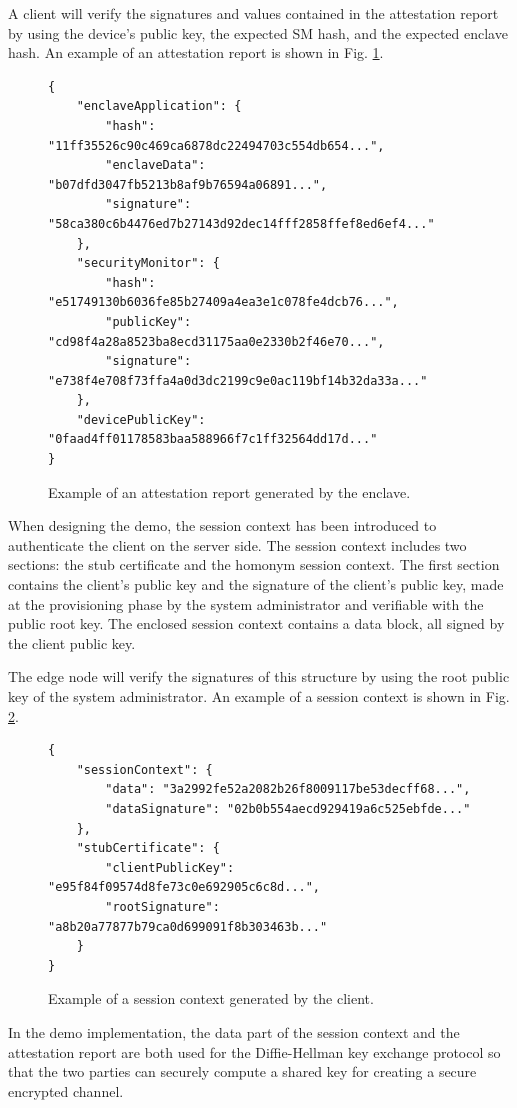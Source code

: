 A client will verify the signatures and values contained in the attestation report by using the device's public key, the expected SM hash, and the expected enclave hash. An example of an attestation report is shown in Fig. \ref{attestation-report}. \\
\begin{figure}[H]
\begin{lstlisting}[style=json, frame=single]
{
    "enclaveApplication": {
        "hash": "11ff35526c90c469ca6878dc22494703c554db654...",
        "enclaveData": "b07dfd3047fb5213b8af9b76594a06891...",
        "signature": "58ca380c6b4476ed7b27143d92dec14fff2858ffef8ed6ef4..."
    },
    "securityMonitor": {
        "hash": "e51749130b6036fe85b27409a4ea3e1c078fe4dcb76...",
        "publicKey": "cd98f4a28a8523ba8ecd31175aa0e2330b2f46e70...",
        "signature": "e738f4e708f73ffa4a0d3dc2199c9e0ac119bf14b32da33a..."
    },
    "devicePublicKey": "0faad4ff01178583baa588966f7c1ff32564dd17d..."
}
\end{lstlisting}
\caption{Example of an attestation report generated by the enclave. \label{attestation-report}}
\end{figure}
When designing the demo, the session context has been introduced to authenticate the client on the server side. The session context includes two sections: the stub certificate and the homonym session context. The first section contains the client's public key and the signature of the client's public key, made at the provisioning phase by the system administrator and verifiable with the public root key. The enclosed session context contains a data block, all signed by the client public key. 

The edge node will verify the signatures of this structure by using the root public key of the system administrator. An example of a session context is shown in Fig. \ref{session-context}. \\
\begin{figure}[H]
\begin{lstlisting}[captionpos=b,style=json, frame=single]
{
    "sessionContext": {
        "data": "3a2992fe52a2082b26f8009117be53decff68...",
        "dataSignature": "02b0b554aecd929419a6c525ebfde..."
    },
    "stubCertificate": {
        "clientPublicKey": "e95f84f09574d8fe73c0e692905c6c8d...",
        "rootSignature": "a8b20a77877b79ca0d699091f8b303463b..."
    }
}
\end{lstlisting}
\caption{Example of a session context generated by the client. \label{session-context}}
\end{figure}
In the demo implementation, the data part of the session context and the attestation report are both used for the Diffie-Hellman key exchange protocol so that the two parties can securely compute a shared key for creating a secure encrypted channel. 

